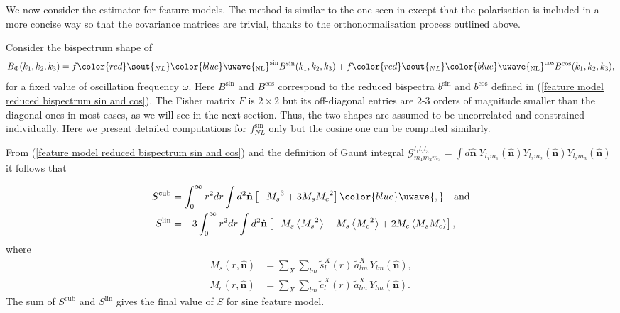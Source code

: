 \documentclass[a4paper,12pt,times,custombib,print,index]{Classes/PhDThesisPSnPDF} %
\providecommand{\DIFadd}[1]{{\protect\color{blue}\uwave{#1}}} %
\providecommand{\DIFdel}[1]{{\protect\color{red}\sout{#1}}}                      %
\providecommand{\DIFaddbegin}{} %
\providecommand{\DIFaddend}{} %
\providecommand{\DIFdelbegin}{} %
\providecommand{\DIFdelend}{} %
\newcommand{\DIFscaledelfig}{0.5}
\newlength{\DIFdelgraphicswidth} %
\newlength{\DIFdelgraphicsheight} %
\newcommand{\DIFaddincludegraphics}[2][]{{\color{blue}\fbox{\DIFOincludegraphics[#1]{#2}}}} %
\newcommand{\DIFdelincludegraphics}[2][]{%
\sbox{\DIFdelgraphicsbox}{\DIFOincludegraphics[#1]{#2}}%
\settoboxwidth{\DIFdelgraphicswidth}{\DIFdelgraphicsbox} %
\settoboxtotalheight{\DIFdelgraphicsheight}{\DIFdelgraphicsbox} %
\scalebox{\DIFscaledelfig}{%
\parbox[b]{\DIFdelgraphicswidth}{\usebox{\DIFdelgraphicsbox}\\[-\baselineskip] \rule{\DIFdelgraphicswidth}{0em}}\llap{\resizebox{\DIFdelgraphicswidth}{\DIFdelgraphicsheight}{%
\setlength{\unitlength}{\DIFdelgraphicswidth}%
\begin{picture}(1,1)%
\thicklines\linethickness{2pt} %
{\color[rgb]{1,0,0}\put(0,0){\framebox(1,1){}}}%
{\color[rgb]{1,0,0}\put(0,0){\line( 1,1){1}}}%
{\color[rgb]{1,0,0}\put(0,1){\line(1,-1){1}}}%
\end{picture}%
}\hspace*{3pt}}} %
} %
\DeclareRobustCommand{\DIFaddbegin}{\DIFOaddbegin \let\includegraphics\DIFaddincludegraphics} %
\DeclareRobustCommand{\DIFaddend}{\DIFOaddend \let\includegraphics\DIFOincludegraphics} %
\DeclareRobustCommand{\DIFdelbegin}{\DIFOdelbegin \let\includegraphics\DIFdelincludegraphics} %
\DeclareRobustCommand{\DIFdelend}{\DIFOaddend \let\includegraphics\DIFOincludegraphics} %
\begin{document}
We now consider the estimator for feature models. The method is similar to the one seen in \cite{Munchmeyer2014} except that the polarisation is included in a more concise way so that the covariance matrices are trivial, thanks to the orthonormalisation process outlined above.

Consider the bispectrum shape of
\begin{equation}
	B_\Phi (k_1, k_2, k_3) = f\DIFdelbegin \DIFdel{_{NL}}\DIFdelend \DIFaddbegin \DIFadd{_\text{NL}}\DIFaddend ^{\sin} B^{\sin}(k_1, k_2, k_3) + f\DIFdelbegin \DIFdel{_{NL}}\DIFdelend \DIFaddbegin \DIFadd{_\text{NL}}\DIFaddend ^{\cos} B^{\cos}(k_1, k_2, k_3),
\end{equation}
for a fixed value of oscillation frequency $\omega$. Here $B^{\sin}$ and $B^{\cos}$ correspond to the reduced bispectra $b^{\sin}$ and $b^{\cos}$ defined in (\ref{feature model reduced bispectrum sin and cos}). The Fisher matrix $F$ is $2\times2$ but its off-diagonal entries are 2-3 orders of magnitude smaller than the diagonal ones in most cases, as we will see in the next section. Thus, the two shapes are assumed to be uncorrelated and constrained individually. Here we present detailed computations for \DIFdelbegin \DIFdel{$f_{NL}^{\sin}$ }\DIFdelend \DIFaddbegin \DIFadd{$f_\text{NL}^{\sin}$ }\DIFaddend only but the cosine one can be computed similarly.

From (\ref{feature model reduced bispectrum sin and cos}) and the definition of Gaunt integral $\mathcal{G}^{l_1 l_2 l_3}_{m_1 m_2 m_3} = \int d\hat{\mathbf{n}} \; Y_{l_1 m_1}(\hat{\mathbf{n}}) Y_{l_2 m_2}(\hat{\mathbf{n}}) Y_{l_3 m_3}(\hat{\mathbf{n}})$ it follows that
\DIFdelbegin %

\DIFdelend \begin{align}
	S^\text{cub} &= \int_0^\infty r^2 dr \int d^2\hat{\mathbf{n}} \left[ - {M_s}^3 + 3 M_s {M_c}^2 \right]\DIFaddbegin \DIFadd{, }\DIFaddend \quad\text{and} \\
	S^\text{lin} &= -3 \int_0^\infty r^2 dr \int d^2\hat{\mathbf{n}} \left[ - {M_s} \left<{M_s}^2\right> + M_s \left< {M_c}^2 \right> + 2 {M_c} \left< {M_s} {M_c} \right> \right], \label{s_lin_using_filtered_maps}
\end{align}
where
\begin{align}
	M_s(r, \hat{\mathbf{n}}) &= \sum_X \sum_{l m} \tilde{s}_l^X(r) \, \tilde{a}_{lm}^X \, Y_{lm}(\hat{\mathbf{n}}), \\
	M_c(r, \hat{\mathbf{n}}) &= \sum_X \sum_{l m} \tilde{c}_l^X(r) \, \tilde{a}_{lm}^X \, Y_{lm}(\hat{\mathbf{n}}).
	\label{M_s definition}
\end{align}
The sum of $S^\text{cub}$ and $S^\text{lin}$ gives the final value of $S$ for \DIFaddbegin \DIFadd{the }\DIFaddend sine feature model.
\end{document}
